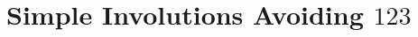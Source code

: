 \documentclass[10pt]{article}
\theoremstyle{plain}
\newcommand{\ds}{\displaystyle}
\newcommand{\br}[1]{\left[{#1}\right]}
\newcommand{\f}[2]{\ds\frac{{#1}}{{#2}}}
\begin{document}
%
%	
%	
	
%
%
%
%
%
%

\section{Simple Involutions Avoiding $123$}
\label{sec-123}
\end{document}
